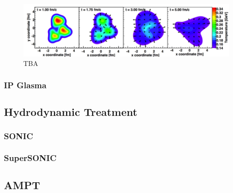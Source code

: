 \begin{figure}[h!]
\begin{center}
\includegraphics[width=0.45\linewidth]{figs/he3au_simulation.png}
\caption{ TBA }
\end{center}
\end{figure}

\subsubsection{IP Glasma}

\subsection{Hydrodynamic Treatment}

\subsubsection{SONIC}

\subsubsection{SuperSONIC}

\subsection{AMPT}

